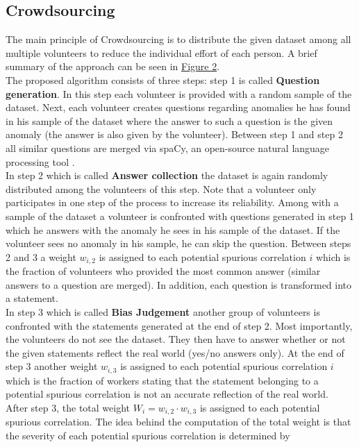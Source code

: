 \documentclass{article}
\begin{document}
\subsection{Crowdsourcing}
The main principle of Crowdsourcing \cite{10.1145/3366423.3380063} is to distribute the given dataset
among all multiple volunteers to reduce the individual effort of each person. A brief summary of the approach
can be seen in \hyperref[fig:crowdsourcing]{Figure 2}. \\
The proposed algorithm consists of three steps: step 1 is called \textbf{Question generation}.
In this step each volunteer is provided with a random sample of the dataset. Next, each volunteer creates questions regarding
anomalies he has found in his sample of the dataset where the answer to such a question is the given anomaly
(the answer is also given by the volunteer). Between step 1 and step 2 all similar questions are merged via spaCy,
an open-source natural language processing tool \cite{spaCy}. \\
In step 2 which is called \textbf{Answer collection} the dataset is again randomly distributed among the volunteers
of this step. Note that a volunteer only participates in one step of the process to increase its reliability.
Among with a sample of the dataset a volunteer is confronted with questions generated in step 1 which he answers with the
anomaly he sees in his sample of the dataset. If the volunteer sees no anomaly in his sample, he can skip the question.
Between steps 2 and 3 a weight $w_{i,2}$ is assigned to each potential spurious correlation $i$ which is the fraction of
volunteers who provided the most common answer (similar answers to a question are merged).
In addition, each question is transformed into a statement. \\
In step 3 which is called \textbf{Bias Judgement} another group of volunteers is confronted with the statements
generated at the end of step 2. Most importantly, the volunteers do not see the dataset.
They then have to answer whether or not the given statements reflect the real world (yes/no answers only).
At the end of step 3 another weight $w_{i,3}$ is assigned to each potential spurious correlation $i$ which is the fraction
of workers stating that the statement belonging to a potential spurious correlation is not an accurate
reflection of the real world. \\
After step 3, the total weight $W_{i}=w_{i,2} \cdot w_{i,3}$ is assigned to each potential spurious correlation. The idea
behind the computation of the total weight is that the severity of each potential spurious correlation is determined by
\end{document}
